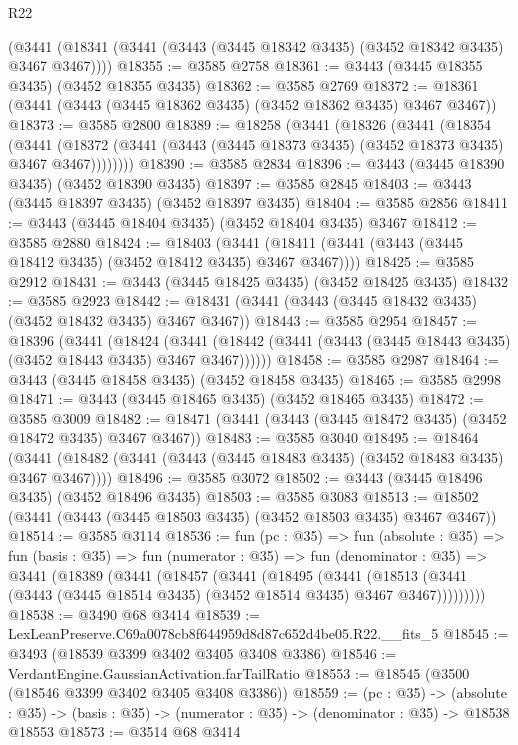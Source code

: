 \begin{lexlean}{R22}
\begin{coremodule}
    (@3441 (@18341 (@3441 (@3443 (@3445 @18342 @3435) (@3452 @18342 @3435) @3467 @3467))))
@18355 := @3585 @2758
@18361 := @3443 (@3445 @18355 @3435) (@3452 @18355 @3435)
@18362 := @3585 @2769
@18372 := @18361 (@3441 (@3443 (@3445 @18362 @3435) (@3452 @18362 @3435) @3467 @3467))
@18373 := @3585 @2800
@18389 := @18258
    (@3441
      (@18326
        (@3441
          (@18354
            (@3441
              (@18372 (@3441 (@3443 (@3445 @18373 @3435) (@3452 @18373 @3435) @3467 @3467))))))))
@18390 := @3585 @2834
@18396 := @3443 (@3445 @18390 @3435) (@3452 @18390 @3435)
@18397 := @3585 @2845
@18403 := @3443 (@3445 @18397 @3435) (@3452 @18397 @3435)
@18404 := @3585 @2856
@18411 := @3443 (@3445 @18404 @3435) (@3452 @18404 @3435) @3467
@18412 := @3585 @2880
@18424 := @18403
    (@3441 (@18411 (@3441 (@3443 (@3445 @18412 @3435) (@3452 @18412 @3435) @3467 @3467))))
@18425 := @3585 @2912
@18431 := @3443 (@3445 @18425 @3435) (@3452 @18425 @3435)
@18432 := @3585 @2923
@18442 := @18431 (@3441 (@3443 (@3445 @18432 @3435) (@3452 @18432 @3435) @3467 @3467))
@18443 := @3585 @2954
@18457 := @18396
    (@3441
      (@18424
        (@3441 (@18442 (@3441 (@3443 (@3445 @18443 @3435) (@3452 @18443 @3435) @3467 @3467))))))
@18458 := @3585 @2987
@18464 := @3443 (@3445 @18458 @3435) (@3452 @18458 @3435)
@18465 := @3585 @2998
@18471 := @3443 (@3445 @18465 @3435) (@3452 @18465 @3435)
@18472 := @3585 @3009
@18482 := @18471 (@3441 (@3443 (@3445 @18472 @3435) (@3452 @18472 @3435) @3467 @3467))
@18483 := @3585 @3040
@18495 := @18464
    (@3441 (@18482 (@3441 (@3443 (@3445 @18483 @3435) (@3452 @18483 @3435) @3467 @3467))))
@18496 := @3585 @3072
@18502 := @3443 (@3445 @18496 @3435) (@3452 @18496 @3435)
@18503 := @3585 @3083
@18513 := @18502 (@3441 (@3443 (@3445 @18503 @3435) (@3452 @18503 @3435) @3467 @3467))
@18514 := @3585 @3114
@18536 := fun (pc : @35) =>
  fun (absolute : @35) =>
  fun (basis : @35) =>
  fun (numerator : @35) =>
  fun (denominator : @35) =>
  @3441
    (@18389
      (@3441
        (@18457
          (@3441
            (@18495
              (@3441
                (@18513 (@3441 (@3443 (@3445 @18514 @3435) (@3452 @18514 @3435) @3467 @3467)))))))))
@18538 := @3490 @68 @3414
@18539 := LexLeanPreserve.C69a0078cb8f644959d8d87c652d4be05.R22.__fits_5
@18545 := @3493 (@18539 @3399 @3402 @3405 @3408 @3386)
@18546 := VerdantEngine.GaussianActivation.farTailRatio
@18553 := @18545 (@3500 (@18546 @3399 @3402 @3405 @3408 @3386))
@18559 := (pc : @35) ->
  (absolute : @35) -> (basis : @35) -> (numerator : @35) -> (denominator : @35) -> @18538 @18553
@18573 := @3514
    @68
    @3414

\end{coremodule}
\end{lexlean}
